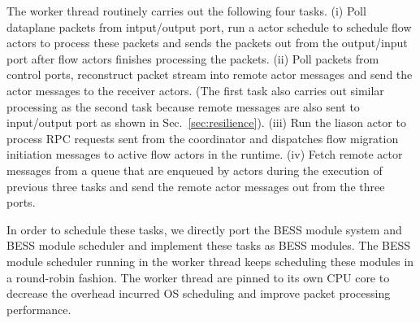 The worker thread routinely carries out the following four tasks. (i) Poll dataplane packets from intput/output port, run a actor schedule to schedule flow actors to process these packets and sends the packets out from the output/input port after flow actors finishes processing the packets. (ii) Poll packets from control ports, reconstruct packet stream into remote actor messages and send the actor messages to the receiver actors. (The first task also carries out similar processing as the second task because remote messages are also sent to input/output port as shown in Sec.~\ref{sec:resilience}). (iii) Run the liason actor to process RPC requests sent from the coordinator and dispatches flow migration initiation messages to active flow actors in the runtime. (iv) Fetch remote actor messages from a queue that are enqueued by actors during the execution of previous three tasks and send the remote actor messages out from the three ports.

In order to schedule these tasks, we directly port the BESS \cite{bess} module system and BESS module scheduler and implement these tasks as BESS modules. The BESS module scheduler running in the worker thread keeps scheduling these modules in a round-robin fashion. The worker thread are pinned to its own CPU core to decrease the overhead incurred OS scheduling and improve packet processing performance.





